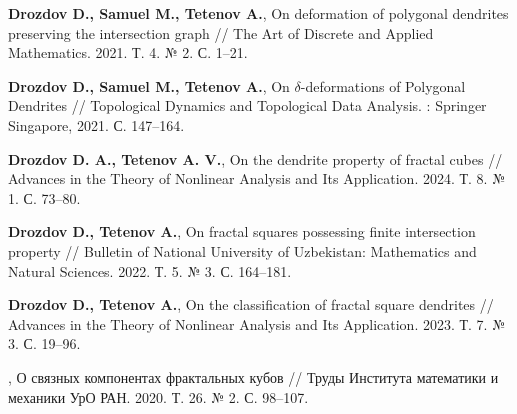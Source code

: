 \documentclass[a5paper,9pt,twoside]{extarticle} %
\begin{document}
\begin{thebibliography}{9}

{\bf Drozdov D., Samuel M., Tetenov A.},
On deformation of polygonal dendrites preserving the intersection graph //
The Art of Discrete and Applied Mathematics. 2021. Т. 4. № 2. С. 1--21.

{\bf Drozdov D., Samuel M., Tetenov A.},
On $\delta$-deformations of Polygonal Dendrites //
Topological Dynamics and Topological Data Analysis. : Springer Singapore, 2021. С. 147--164.

{\bf Drozdov D. A., Tetenov A. V.}, On the dendrite property of fractal cubes // Advances in the Theory of Nonlinear Analysis and Its Application. 2024. Т. 8. № 1. С. 73--80.

{\bf Drozdov D., Tetenov A.},
On fractal squares possessing finite intersection property //
Bulletin of National University of Uzbekistan: Mathematics and Natural Sciences. 2022. Т. 5. № 3. С. 164--181.

{\bf Drozdov D., Tetenov A.},
On the classification of fractal square dendrites //
Advances in the Theory of Nonlinear Analysis and Its Application. 2023. Т. 7. № 3. С. 19--96.

,
О связных компонентах фрактальных кубов //
Труды Института математики и механики УрО РАН. 2020. Т. 26. № 2. С. 98--107.


\end{thebibliography}


%
%
%
%
%
%
%
\end{document}
